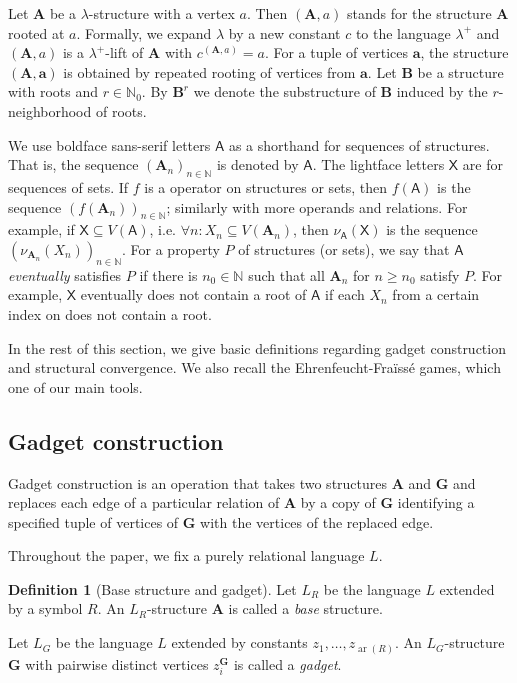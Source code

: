 \documentclass[11pt]{article}
\theoremstyle{plain}
\theoremstyle{definition}
\newtheorem{definition}{Definition}
\theoremstyle{remark}
\DeclareMathOperator\aritysym{ar}
\newcommand{\arity}[1]{{\aritysym({#1})}}
\newcommand{\N}{\mathbb{N}}
\newcommand{\str}[1]{\mathbf{#1}}
\newcommand{\strseq}[1]{{\boldsymbol{\mathsf{#1}}}}
\newcommand{\seq}[1]{{\mathsf{#1}}}
\newcommand{\tpl}[1]{{\bm{#1}}}
\begin{document}
Let $\str{A}$ be a $\lambda$-structure with a vertex $a$.
Then $(\str{A}, a)$ stands for the structure $\str{A}$ rooted at $a$.
Formally, we expand $\lambda$ by a new constant $c$ to the language $\lambda^+$ and $(\str{A}, a)$ is a $\lambda^+$-lift of $\str{A}$ with $c^{(\str{A},a)} = a$.
For a tuple of vertices $\tpl{a}$, the structure $(\str{A}, \tpl{a})$ is obtained by repeated rooting of vertices from $\tpl{a}$.
Let $\str{B}$ be a structure with roots and $r \in \N_0$.
By $\str{B}^r$ we denote the substructure of $\str{B}$ induced by the $r$-neighborhood of roots.

We use boldface sans-serif letters $\strseq{A}$ as a shorthand for sequences of structures.
That is, the sequence $(\str{A}_n)_{n \in \N}$ is denoted by $\strseq{A}$.
The lightface letters $\seq{X}$ are for sequences of sets.
If $f$ is a operator on structures or sets, then $f(\strseq{A})$ is the sequence $(f(\str{A}_n))_{n \in \N}$; similarly with more operands and relations.
For example, if $\seq{X} \subseteq V(\strseq{A})$, i.e. $\forall n: X_n \subseteq V(\str{A}_n)$, then $\nu_\strseq{A}(\seq{X})$ is the sequence $(\nu_{\str{A}_n}(X_n))_{n \in \N}$.
For a property $P$ of structures (or sets), we say that $\strseq{A}$ \emph{eventually} satisfies $P$ if there is $n_0 \in \N$ such that all $\str{A}_n$ for $n \geq n_0$ satisfy $P$.
For example, $\seq{X}$ eventually does not contain a root of $\strseq{A}$ if each $X_n$ from a certain index on does not contain a root.

In the rest of this section, we give basic definitions regarding gadget construction and structural convergence.
We also recall the Ehrenfeucht-Fra\"{i}ss\'{e} games, which one of our main tools.

\subsection{Gadget construction}\label{ssec:gadget_construction}

Gadget construction is an operation that takes two structures $\str{A}$ and $\str{G}$ and replaces each edge of a particular relation of $\str{A}$ by a copy of $\str{G}$ identifying a specified tuple of vertices of $\str{G}$ with the vertices of the replaced edge.

Throughout the paper, we fix a purely relational language $L$.

\begin{definition}[Base structure and gadget]\label{def:base_structure_and_gadget}
    Let $L_R$ be the language $L$ extended by a symbol $R$.
    An $L_R$-structure $\str{A}$ is called a \emph{base} structure.
    
    Let $L_G$ be the language $L$ extended by constants $z_1, \dots, z_{\arity{R}}$.
    An $L_G$-structure $\str{G}$ with pairwise distinct vertices $z_i^\str{G}$ is called a \emph{gadget}.
\end{definition}
\end{document}
